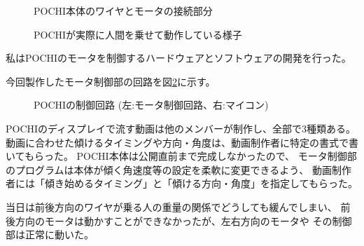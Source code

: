 \begin{figure}[H]
\centering
\begin{minipage}{0.45\linewidth}
\caption{POCHI本体のワイヤとモータの接続部分}
\label{fig:pochi-wire-with-motor}
\end{minipage}
\begin{minipage}{0.45\linewidth}
\caption{POCHIが実際に人間を乗せて動作している様子}
\label{fig:pochi-motion}
\end{minipage}
\end{figure}

私はPOCHIのモータを制御するハードウェアとソフトウェアの開発を行った。

今回製作したモータ制御部の回路を図\ref{fig:pochi-circuit}に示す。

\begin{figure}[H]
\centering
\begin{minipage}{0.5\linewidth}
\caption{POCHIの制御回路 (左:モータ制御回路、右:マイコン)}
\label{fig:pochi-circuit}
\end{minipage}
\end{figure}

POCHIのディスプレイで流す動画は他のメンバーが制作し、全部で3種類ある。
動画に合わせた傾けるタイミングや方向・角度は、動画制作者に特定の書式で書いてもらった。
POCHI本体は公開直前まで完成しなかったので、
モータ制御部のプログラムは本体が傾く角速度等の設定を柔軟に変更できるよう、
動画制作者には「傾き始めるタイミング」と「傾ける方向・角度」を指定してもらった。

当日は前後方向のワイヤが乗る人の重量の関係でどうしても緩んでしまい、
前後方向のモータは動かすことができなかったが、左右方向のモータや
その制御部は正常に動いた。
